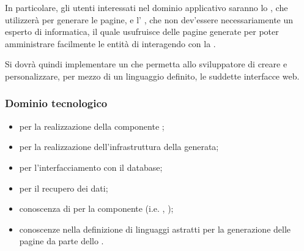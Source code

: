         
In particolare, gli utenti interessati nel dominio applicativo saranno lo  , che utilizzerà \ProjectName per generare le pagine, e l' , che non dev'essere necessariamente un esperto di informatica, il quale usufruisce delle pagine generate per poter amministrare facilmente le entità di   interagendo con la  .

Si dovrà quindi implementare un  che permetta allo sviluppatore di creare e personalizzare, per mezzo di un linguaggio   definito, le suddette interfacce web.
        
        \subsubsection{Dominio tecnologico}
        \begin{itemize}
                \item \textbf{ } per la realizzazione della componente  ;
                \item \textbf{ } per la realizzazione dell'infrastruttura della   generata;
                \item \textbf{ } per l'interfacciamento con il database;
                \item \textbf{ } per il recupero dei dati;
                \item conoscenza di   per la componente   (i.e.  ,  );
                \item conoscenze nella definizione di linguaggi astratti   per la generazione delle pagine da parte dello  .
        \end{itemize}



